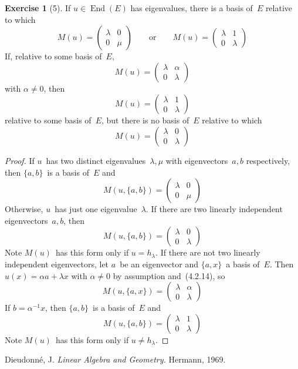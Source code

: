\documentclass[letterpaper,12pt]{article}
\DeclareMathOperator{\End}{End}
\theoremstyle{definition}
\newtheorem*{exer}{Exercise}
\theoremstyle{remark}
\begin{document}
\begin{exer}[5]
If \(u\in\End(E)\) has eigenvalues, there is a basis of~\(E\) relative to which
\[M(u)=\begin{pmatrix}
\lambda&0\\
0&\mu
\end{pmatrix}
\qquad\text{or}\qquad
M(u)=\begin{pmatrix}
\lambda&1\\
0&\lambda
\end{pmatrix}\]
If, relative to some basis of~\(E\),
\[M(u)=\begin{pmatrix}
\lambda&\alpha\\
0&\lambda
\end{pmatrix}\]
with \(\alpha\ne 0\), then
\[M(u)=\begin{pmatrix}
\lambda&1\\
0&\lambda
\end{pmatrix}\]
relative to some basis of~\(E\), but there is no basis of~\(E\) relative to which
\[M(u)=\begin{pmatrix}
\lambda&0\\
0&\lambda
\end{pmatrix}\]
\end{exer}
\begin{proof}
If \(u\)~has two distinct eigenvalues~\(\lambda,\mu\) with eigenvectors~\(a,b\) respectively, then \(\{a,b\}\)~is a basis of~\(E\) and
\[M(u,\{a,b\})=\begin{pmatrix}
\lambda&0\\
0&\mu
\end{pmatrix}\]
Otherwise, \(u\)~has just one eigenvalue~\(\lambda\). If there are two linearly independent eigenvectors~\(a,b\), then
\[M(u,\{a,b\})=\begin{pmatrix}
\lambda&0\\
0&\lambda
\end{pmatrix}\]
Note \(M(u)\)~has this form only if \(u=h_{\lambda}\). If there are not two linearly independent eigenvectors, let \(a\)~be an eigenvector and \(\{a,x\}\)~a basis of~\(E\). Then \(u(x)=\alpha a+\lambda x\) with \(\alpha\ne 0\) by assumption and~(4.2.14), so
\[M(u,\{a,x\})=\begin{pmatrix}
\lambda&\alpha\\
0&\lambda
\end{pmatrix}\]
If \(b=\alpha^{-1}x\), then \(\{a,b\}\)~is a basis of~\(E\) and
\[M(u,\{a,b\})=\begin{pmatrix}
\lambda&1\\
0&\lambda
\end{pmatrix}\]
Note \(M(u)\)~has this form only if \(u\ne h_{\lambda}\).
\end{proof}

\begin{thebibliography}{0}
 Dieudonn\'e, J. \textit{Linear Algebra and Geometry.} Hermann, 1969.
\end{thebibliography}
\end{document}
